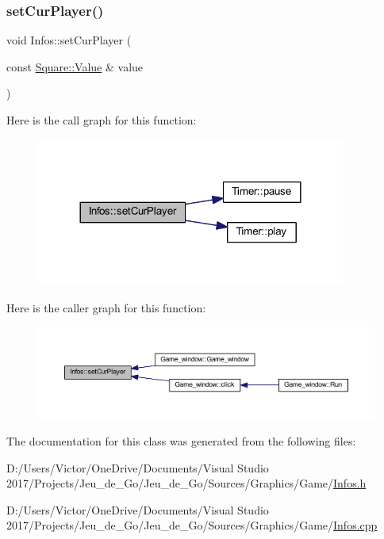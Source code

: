 \subsubsection{\texorpdfstring{set\+Cur\+Player()}{setCurPlayer()}}
{\footnotesize\ttfamily void Infos\+::set\+Cur\+Player (\begin{DoxyParamCaption}\item[{const \hyperlink{class_square_a7feeec236c037a9849114226adaa4ecc}{Square\+::\+Value} \&}]{value }\end{DoxyParamCaption})}

Here is the call graph for this function\+:\nopagebreak
\begin{figure}[H]
\begin{center}
\leavevmode
\includegraphics[width=288pt]{class_infos_a5dee8a8817c307c570db905429480d79_cgraph}
\end{center}
\end{figure}
Here is the caller graph for this function\+:\nopagebreak
\begin{figure}[H]
\begin{center}
\leavevmode
\includegraphics[width=350pt]{class_infos_a5dee8a8817c307c570db905429480d79_icgraph}
\end{center}
\end{figure}


The documentation for this class was generated from the following files\+:\begin{DoxyCompactItemize}
\item 
D\+:/\+Users/\+Victor/\+One\+Drive/\+Documents/\+Visual Studio 2017/\+Projects/\+Jeu\+\_\+de\+\_\+\+Go/\+Jeu\+\_\+de\+\_\+\+Go/\+Sources/\+Graphics/\+Game/\hyperlink{_infos_8h}{Infos.\+h}\item 
D\+:/\+Users/\+Victor/\+One\+Drive/\+Documents/\+Visual Studio 2017/\+Projects/\+Jeu\+\_\+de\+\_\+\+Go/\+Jeu\+\_\+de\+\_\+\+Go/\+Sources/\+Graphics/\+Game/\hyperlink{_infos_8cpp}{Infos.\+cpp}\end{DoxyCompactItemize}
